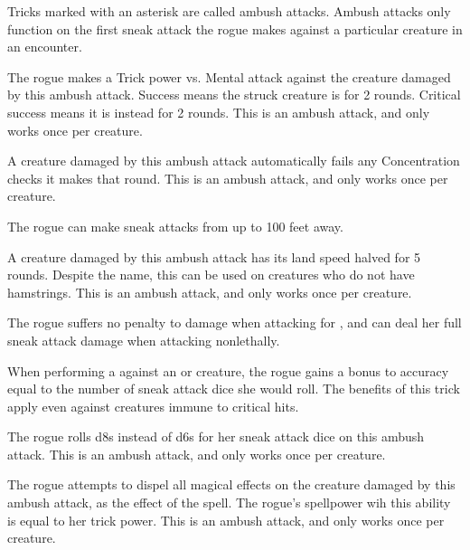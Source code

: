         Tricks marked with an asterisk are called ambush attacks.
        Ambush attacks only function on the first sneak attack the rogue makes against a particular creature in an encounter.

        The rogue makes a Trick power vs. Mental attack against the creature damaged by this ambush attack.
        Success means the struck creature is \dazed for 2 rounds.
        Critical success means it is instead \confused for 2 rounds.
        This is an ambush attack, and only works once per creature.

        A creature damaged by this ambush attack automatically fails any Concentration checks it makes that round.
        This is an ambush attack, and only works once per creature.

        The rogue can make sneak attacks from up to 100 feet away.

        A creature damaged by this ambush attack has its land speed halved for 5 rounds.
        Despite the name, this can be used on creatures who do not have hamstrings.
        This is an ambush attack, and only works once per creature.

        The rogue suffers no penalty to damage when attacking for , and can deal her full sneak attack damage when attacking nonlethally.


        When performing a  against an  or \unaware creature, the rogue gains a bonus to accuracy equal to the number of sneak attack dice she would roll.
        The benefits of this trick apply even against creatures immune to critical hits.

        The rogue rolls d8s instead of d6s for her sneak attack dice on this ambush attack.
        This is an ambush attack, and only works once per creature.

        The rogue attempts to dispel all magical effects on the creature damaged by this ambush attack, as the effect of the  spell.
        The rogue's spellpower wih this ability is equal to her trick power.
        This is an ambush attack, and only works once per creature.

